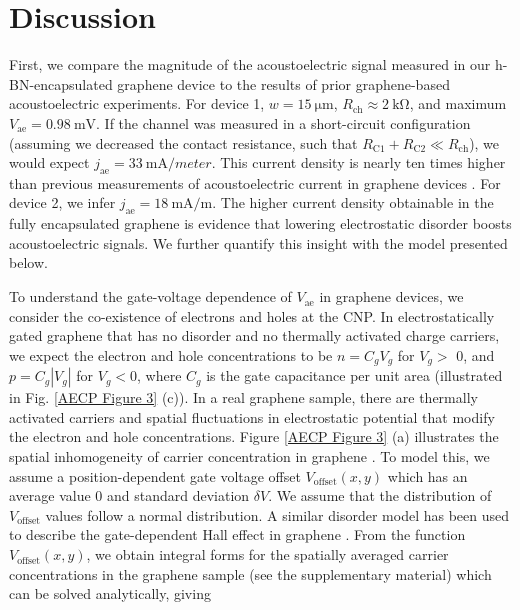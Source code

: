\documentclass[double,12pt,1in,seploa]{beavtex}
\let\Oldsection\section
\renewcommand{\section}{\FloatBarrier\Oldsection}
\begin{document}
\section{Discussion} \label{AE paper discussion}
First, we compare the magnitude of the acoustoelectric signal measured in our h-BN-encapsulated graphene device to the results of prior graphene-based acoustoelectric experiments. For device 1, $w = \SI{15}{\micro\meter}$, $R_{\mathrm{ch}} \approx \SI{2}{\kilo\ohm}$, and maximum  $V_{\mathrm{ae}} = \SI{0.98}{\milli\volt}$. If the channel was measured in a short-circuit configuration (assuming we decreased the contact resistance, such that $R_{\mathrm{C1}} + R_{\mathrm{C2}} \ll R_{\mathrm{ch}}$), we would expect $j_{\mathrm{ae}} = \SI{33}{\milli \ampere/meter}$. This current density is nearly ten times higher than previous measurements of acoustoelectric current in graphene devices \cite{bandhu_controlling_2016,okuda_acoustic_2016,tang_ultra-low_2017,okuda_graphene_2018}. For device 2, we infer $j_{\mathrm{ae}} = \SI{18}{\milli \ampere/\meter}$. The higher current density obtainable in the fully encapsulated graphene is evidence that lowering electrostatic disorder boosts acoustoelectric signals. We further quantify this insight with the model presented below.

To understand the gate-voltage dependence of $V_{\mathrm{ae}}$ in graphene devices, we consider the co-existence of electrons and holes at the CNP. In electrostatically gated graphene that has no disorder and no thermally activated charge carriers, we expect the electron and hole concentrations to be $n = C_g V_g$ for $V_g >$ 0, and $p = C_g |V_g|$ for $V_g < 0$, where $C_g$ is the gate capacitance per unit area (illustrated in Fig. \ref{AECP Figure 3} (c)). In a real graphene sample, there are thermally activated carriers and spatial fluctuations in electrostatic potential that modify the electron and hole concentrations. Figure \ref{AECP Figure 3} (a) illustrates the spatial inhomogeneity of carrier concentration in graphene \cite{martin_observation_2008}. To model this, we assume a position-dependent gate voltage offset $V_{\mathrm{offset}}(x,y)$ which has an average value 0 and standard deviation $\delta V$. We assume that the distribution of $V_{\mathrm{offset}}$ values follow a normal distribution. A similar disorder model has been used to describe the gate-dependent Hall effect in graphene \cite{brown_hall_2019}. From the function $V_{\mathrm{offset}}(x,y)$, we obtain integral forms for the spatially averaged carrier concentrations in the graphene sample (see the supplementary material) which can be solved analytically, giving
\end{document}
